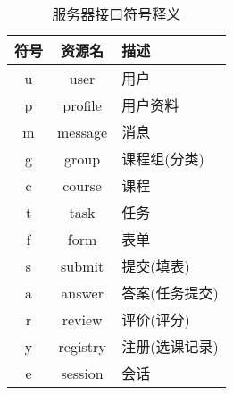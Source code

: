 \noindent
\ttfamily
\begin{longtable}{|c|c|l|}

  \caption{服务器接口符号释义\label{APURIGlossary}}
  \\
  \hline

  \textbf{符号} & \textbf{资源名} & \textbf{描述} \\ \hline

  u & user      & 用户          \\ \hline
  p & profile   & 用户资料      \\ \hline
  m & message   & 消息          \\ \hline
  g & group     & 课程组(分类)  \\ \hline
  c & course    & 课程          \\ \hline
  t & task      & 任务          \\ \hline
  f & form      & 表单          \\ \hline
  s & submit    & 提交(填表)    \\ \hline
  a & answer    & 答案(任务提交)\\ \hline
  r & review    & 评价(评分)    \\ \hline
  y & registry  & 注册(选课记录)\\ \hline
  e & session   & 会话          \\ \hline

\end{longtable}


